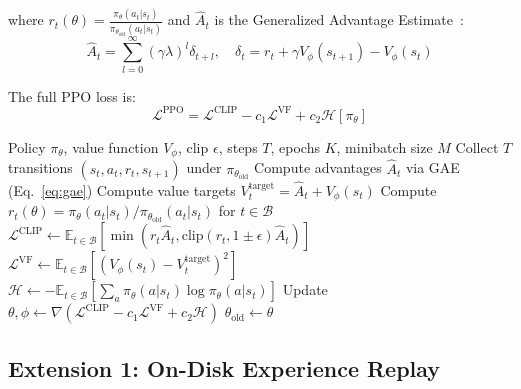 \documentclass[11pt,a4paper]{article}
\begin{document}
where $r_t(\theta) = \frac{\pi_\theta(a_t|s_t)}{\pi_{\theta_{\text{old}}}(a_t|s_t)}$ and $\hat{A}_t$ is the Generalized Advantage Estimate~\cite{schulman2015high}:
\begin{equation}
\hat{A}_t = \sum_{l=0}^{\infty} (\gamma\lambda)^l \delta_{t+l}, \quad \delta_t = r_t + \gamma V_\phi(s_{t+1}) - V_\phi(s_t)
\label{eq:gae}
\end{equation}

The full PPO loss is:
\begin{equation}
\mathcal{L}^{\text{PPO}} = \mathcal{L}^{\text{CLIP}} - c_1 \mathcal{L}^{\text{VF}} + c_2 \mathcal{H}[\pi_\theta]
\label{eq:ppo-full}
\end{equation}

\begin{algorithm}[t]
\caption{Proximal Policy Optimization (PPO)}
\label{alg:ppo}
\begin{algorithmic}[1]
\Require Policy $\pi_\theta$, value function $V_\phi$, clip $\epsilon$, steps $T$, epochs $K$, minibatch size $M$
    \State Collect $T$ transitions $(s_t, a_t, r_t, s_{t+1})$ under $\pi_{\theta_{\text{old}}}$
    \State Compute advantages $\hat{A}_t$ via GAE (Eq.~\ref{eq:gae})
    \State Compute value targets $V_t^{\text{target}} = \hat{A}_t + V_\phi(s_t)$
            \State Compute $r_t(\theta) = \pi_\theta(a_t|s_t) / \pi_{\theta_{\text{old}}}(a_t|s_t)$ for $t \in \mathcal{B}$
            \State $\mathcal{L}^{\text{CLIP}} \leftarrow \mathbb{E}_{t \in \mathcal{B}}\left[\min(r_t \hat{A}_t, \text{clip}(r_t, 1 \pm \epsilon) \hat{A}_t)\right]$
            \State $\mathcal{L}^{\text{VF}} \leftarrow \mathbb{E}_{t \in \mathcal{B}}\left[(V_\phi(s_t) - V_t^{\text{target}})^2\right]$
            \State $\mathcal{H} \leftarrow -\mathbb{E}_{t \in \mathcal{B}}\left[\sum_a \pi_\theta(a|s_t) \log \pi_\theta(a|s_t)\right]$
            \State Update $\theta, \phi \leftarrow \nabla(\mathcal{L}^{\text{CLIP}} - c_1 \mathcal{L}^{\text{VF}} + c_2 \mathcal{H})$
        \EndFor
    \EndFor
    \State $\theta_{\text{old}} \leftarrow \theta$
\EndFor
\end{algorithmic}
\end{algorithm}

\subsection{Extension 1: On-Disk Experience Replay}
\end{document}
